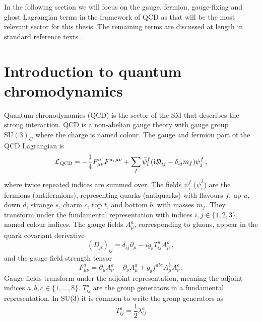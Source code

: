 \documentclass[main.tex]{subfiles}
\begin{document}
    In the following section we will focus on the gauge, fermion, gauge-fixing
    and ghost Lagrangian terms in the framework of QCD as that will be the
    most relevant sector for this thesis. The remaining terms are discussed at
    length in standard reference texts \cite{Peskin:1995ev,Schwartz:2014sze,Romao:2012pq}.


\section{Introduction to quantum chromodynamics}
    Quantum chronodynamics (QCD) is the sector of the SM that
    describes the strong interaction. 
    QCD is a non-abelian gauge theory with gauge group
    $\mathrm{SU}(3)_{C}$ where the charge is named colour.
    The gauge and fermion part of the QCD Lagrangian is
    \begin{equation}\label{eqn:L_QCD}
        \mathcal{L}_{\mathrm{QCD}} = -\dfrac{1}{4}F^{a}_{\mu\nu}F^{a, \, \mu\nu}
        + \sum_{f} \bar{\psi}_{i}^{f}(\mathrm{i}\slashed{D}_{ij} - \delta_{ij}m_{f})\psi_{j}^{f} \, ,
    \end{equation}
    where twice repeated indices are summed over.
    The fields $\psi_{i}^{f}$ ($\bar{\psi}_{i}^{f}$) are the fermions (antifermions),
    representing quarks (antiquarks) with flavours $f$: 
    up $u$, down $d$, strange $s$, charm $c$, top $t$, and bottom $b$,
    with masses $m_{f}$. They transform under the fundamental
    representation with indices $i, j \in \{1, 2, 3\}$, named colour indices.
    The gauge fields $A^{a}_{\mu}$, corresponding to gluons, 
    appear in the quark covariant derivative
    \begin{equation}\label{eqn:covariant_deriv}
        (D_{\mu})_{ij} = \delta_{ij}\partial_{\mu} - ig_{\mathrm{s}}T^{a}_{ij}A^{a}_{\mu} \, ,
    \end{equation}
    and the gauge field strength tensor
    \begin{equation}\label{eqn:F_munu}
        F^{a}_{\mu\nu} = \partial_{\mu}A^{a}_{\nu} - \partial_{\nu}A^{a}_{\mu} + g_{\mathrm{s}} f^{abc}A^{b}_{\mu}A^{c}_{\nu} \, .
    \end{equation}
    Gauge fields transform under the adjoint representation, meaning
    the adjoint indices $a,b,c \in \{1,...,8\}$. $T^{a}_{ij}$ are the
    group generators in a fundamental representation. In SU(3) it is
    common to write the group generators as
    \begin{equation}\label{eqn:group_generators}
        T^{a}_{ij} = \dfrac{1}{2}\lambda^{a}_{ij}
    \end{equation}
\end{document}
